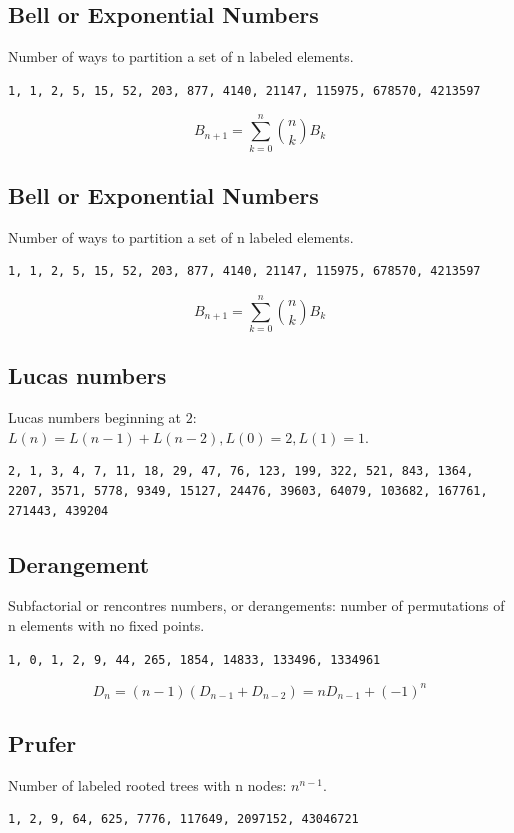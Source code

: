 \documentclass[9pt,landscape]{article}
\begin{document}
\begin{multicols}{2}
\subsection{Bell or Exponential Numbers}
Number of ways to partition a set of n labeled elements.
\begin{lstlisting}
1, 1, 2, 5, 15, 52, 203, 877, 4140, 21147, 115975, 678570, 4213597
\end{lstlisting}
\begin{equation*}
B_{n+1}=\sum_{k=0}^n\binom{n}{k}B_k
\end{equation*}

\subsection{Bell or Exponential Numbers}
Number of ways to partition a set of n labeled elements.
\begin{lstlisting}
1, 1, 2, 5, 15, 52, 203, 877, 4140, 21147, 115975, 678570, 4213597
\end{lstlisting}
\begin{equation*}
B_{n+1}=\sum_{k=0}^n\binom{n}{k}B_k
\end{equation*}

\subsection{Lucas numbers}
Lucas numbers beginning at $2$: $L(n) = L(n-1) + L(n-2), L(0) = 2, L(1) = 1$.
\begin{lstlisting}
2, 1, 3, 4, 7, 11, 18, 29, 47, 76, 123, 199, 322, 521, 843, 1364, 2207, 3571, 5778, 9349, 15127, 24476, 39603, 64079, 103682, 167761, 271443, 439204
\end{lstlisting}

\subsection{Derangement}
Subfactorial or rencontres numbers, or derangements: number of permutations of n elements with no fixed points.
\begin{lstlisting}
1, 0, 1, 2, 9, 44, 265, 1854, 14833, 133496, 1334961
\end{lstlisting}
\begin{equation*}
D_n=(n-1)(D_{n-1}+D_{n-2})=nD_{n-1}+(-1)^n
\end{equation*}

\subsection{Prufer}
Number of labeled rooted trees with n nodes: $n^{n-1}$.
\begin{lstlisting}
1, 2, 9, 64, 625, 7776, 117649, 2097152, 43046721
\end{lstlisting}


\end{multicols}
\end{document}
